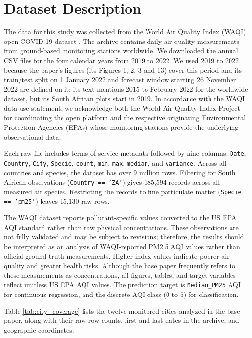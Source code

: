 \section{Dataset Description}
The data for this study was collected from the World Air Quality Index (WAQI) open COVID-19 dataset \cite{waqi2020covid}. The archive contains daily air quality measurements from ground-based monitoring stations worldwide. We downloaded the annual CSV files for the four calendar years from 2019 to 2022. We used 2019 to 2022 because the paper's figures (its Figures 1, 2, 3 and 13) cover this period and its train/test split on 1 January 2022 and forecast window starting 26 November 2022 are defined on it; its text mentions 2015 to February 2022 for the worldwide dataset, but its South African plots start in 2019. In accordance with the WAQI data-use statement, we acknowledge both the World Air Quality Index Project for coordinating the open platform and the respective originating Environmental Protection Agencies (EPAs) whose monitoring stations provide the underlying observational data.

Each raw file includes terms of service metadata followed by nine columns: \texttt{Date}, \texttt{Country}, \texttt{City}, \texttt{Specie}, \texttt{count}, \texttt{min}, \texttt{max}, \texttt{median}, and \texttt{variance}. Across all countries and species, the dataset has over 9 million rows. Filtering for South African observations (\texttt{Country == 'ZA'}) gives 185,594 records across all measured air species. Restricting the records to fine particulate matter (\texttt{Specie == 'pm25'}) leaves 15,130 raw rows.

The WAQI dataset reports pollutant-specific values converted to the US EPA AQI standard rather than raw physical concentrations. These observations are not fully validated and may be subject to revisions; therefore, the results should be interpreted as an analysis of WAQI-reported PM2.5 AQI values rather than official ground-truth measurements. Higher index values indicate poorer air quality and greater health risks. Although the base paper frequently refers to these measurements as concentrations, all figures, tables, and target variables reflect unitless US EPA AQI values. The prediction target is \texttt{Median\_PM25} AQI for continuous regression, and the discrete AQI class ($0$ to $5$) for classification.

Table \ref{tab:city_coverage} lists the twelve monitored cities analyzed in the base paper, along with their raw row counts, first and last dates in the archive, and geographic coordinates.

